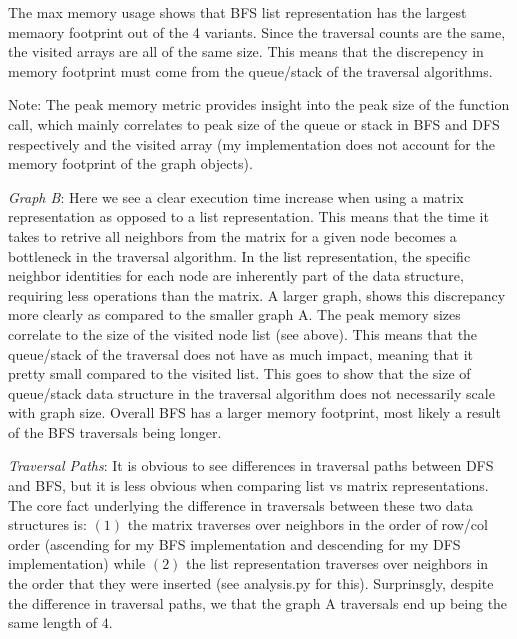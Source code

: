 \documentclass[letterpaper, 11pt]{extarticle}
\begin{document}
The max memory usage shows that BFS list representation has the largest memaory footprint out of the 4 variants. Since the traversal counts are the same, the visited arrays are all of the same size. This means that the discrepency in memory footprint must come from the queue/stack of the traversal algorithms.

Note: The peak memory metric provides insight into the peak size of the function call, which mainly correlates to peak size of the queue or stack in BFS and DFS respectively and the visited array (my implementation does not account for the memory footprint of the graph objects). 

\textit{Graph B}: Here we see a clear execution time increase when using a matrix representation as opposed to a list representation. This means that the time it takes to retrive all neighbors from the matrix for a given node becomes a bottleneck in the traversal algorithm. In the list representation, the specific neighbor identities for each node are inherently part of the data structure, requiring less operations than the matrix. A larger graph, shows this discrepancy more clearly as compared to the smaller graph A. The peak memory sizes correlate to the size of the visited node list (see above). This means that the queue/stack of the traversal does not have as much impact, meaning that it pretty small compared to the visited list. This goes to show that the size of queue/stack data structure in the traversal algorithm does not necessarily scale with graph size. Overall BFS has a larger memory footprint, most likely a result of the BFS traversals being longer.


\textit{Traversal Paths}: It is obvious to see differences in traversal paths between DFS and BFS, but it is less obvious when comparing list vs matrix representations. The core fact underlying the difference in traversals between these two data structures is: $(1)$ the matrix traverses over neighbors in the order of row/col order (ascending for my BFS implementation and descending for my DFS implementation) while $(2)$ the list representation traverses over neighbors in the order that they were inserted (see analysis.py for this). Surprinsgly, despite the difference in traversal paths, we that the graph A traversals end up being the same length of $4$.
\end{document}
